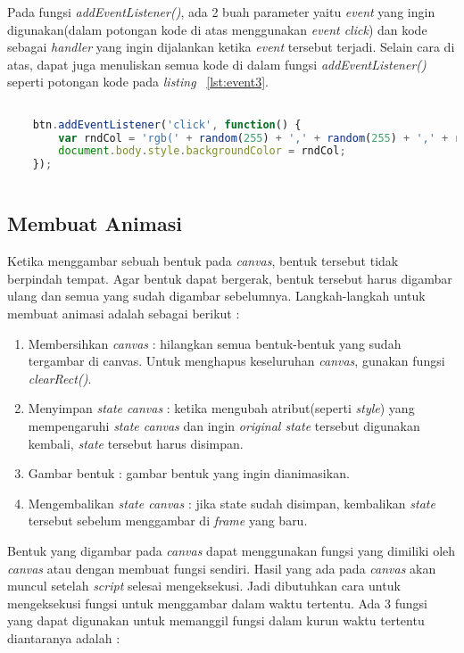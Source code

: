 Pada fungsi \textit{addEventListener()}, ada 2 buah parameter yaitu \textit{event} yang ingin digunakan(dalam potongan kode di atas menggunakan \textit{event click}) dan kode sebagai \textit{handler} yang ingin dijalankan ketika \textit{event} tersebut terjadi. Selain cara di atas, dapat juga menuliskan semua kode di dalam fungsi \textit{addEventListener()} seperti potongan kode pada \textit{listing} ~\ref{lst:event3}.

\begin{lstlisting}[language=Javascript, caption=Menuliskan kode di dalam fungsi addEventListener(), label={lst:event3}]

	btn.addEventListener('click', function() {
  		var rndCol = 'rgb(' + random(255) + ',' + random(255) + ',' + random(255) + ')';
  		document.body.style.backgroundColor = rndCol;
	});
	
\end{lstlisting}


\subsection{Membuat Animasi}
Ketika menggambar sebuah bentuk pada \textit{canvas}, bentuk tersebut tidak berpindah tempat. Agar bentuk dapat bergerak, bentuk tersebut harus digambar ulang dan semua yang sudah digambar sebelumnya. Langkah-langkah untuk membuat animasi adalah sebagai berikut :

\begin{enumerate}
	\item Membersihkan \textit{canvas} : hilangkan semua bentuk-bentuk yang sudah tergambar di canvas. Untuk menghapus keseluruhan \textit{canvas}, gunakan fungsi \textit{clearRect()}.
	\item Menyimpan \textit{state canvas} : ketika mengubah atribut(seperti \textit{style}) yang mempengaruhi \textit{state canvas} dan ingin \textit{original state} tersebut digunakan kembali, \textit{state} tersebut harus disimpan. 
	\item Gambar bentuk : gambar bentuk yang ingin dianimasikan.
	\item Mengembalikan \textit{state canvas} : jika state sudah disimpan, kembalikan \textit{state} tersebut sebelum menggambar di \textit{frame} yang baru.
\end{enumerate}

Bentuk yang digambar pada \textit{canvas} dapat menggunakan fungsi yang dimiliki oleh \textit{canvas} atau dengan membuat fungsi sendiri. Hasil yang ada pada \textit{canvas} akan muncul setelah \textit{script} selesai mengeksekusi. Jadi dibutuhkan cara untuk mengeksekusi fungsi untuk menggambar dalam waktu tertentu. Ada 3 fungsi yang dapat digunakan untuk memanggil fungsi dalam kurun waktu tertentu diantaranya adalah :

